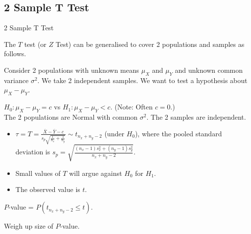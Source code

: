 \documentclass[t,xcolor=pdftex,dvipsnames,table]{beamer}\usepackage[]{graphicx}\usepackage[]{color}
\begin{document}
\subsection[T Test]{2 Sample T Test}
\begin{frame}[fragile]{2 Sample T Test}

The $T$ test (or $Z$ Test) can be generalised to cover 2 populations and samples as follows.

\vspace{.5cm}
Consider 2 populations with unknown means $\mu_{X}$ and $\mu_{Y}$ and unknown common variance $\sigma^{2}$. We take 2 independent  samples. We want to test a hypothesis about $\mu_{X}-\mu_{Y}$.

\vspace{.5cm}
 $H_{0}: \mu_{X}-\mu_{Y} = c$ vs $H_{1}: \mu_{X}-\mu_{Y} < c$. (Note: Often $c = 0$.) \\

\vspace{.5cm}
 The 2 populations are  Normal with common $\sigma^2$. The 2 samples are independent.

\end{frame}  


\begin{frame}[fragile]{}

\begin{itemize}
\item $\tau = T = \frac{ \bar{X} - \bar{Y} - c }{ s_{p}  \sqrt{ \frac{1}{n_{x}} + \frac{1}{n_{y}} }}  \sim t_{ n_{x} + n_{y}-2 }$ (under $H_{0}$),
where the pooled standard deviation is
$s_{p} = \sqrt{  \frac{ (n_{x}-1) s_{x}^2 +  (n_{y}-1) s_{y}^2 }{n_{x} + n_{y} -2}  }$.  
\item Small values of $T$ will argue against $H_{0}$ for $H_{1}$. 
\item The observed value is $t$. 
\end{itemize}

\vspace{.5cm}
 $P$-value = $P( t_{n_{x} + n_{y} -2} \leq t)$.

\vspace{.5cm}
 Weigh up size of $P$-value.
\end{frame}  
\end{document}
